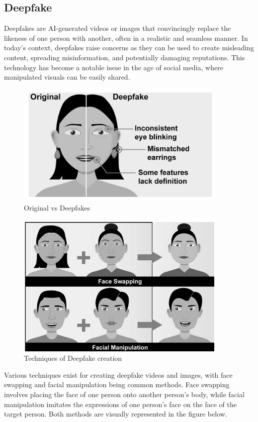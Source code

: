
\subsection{Deepfake}
Deepfakes are AI-generated videos or images that convincingly replace the likeness of one person with another, often in a realistic and seamless manner. In today's context, deepfakes raise concerns as they can be used to create misleading content, spreading misinformation, and potentially damaging reputations. This technology has become a notable issue in the age of social media, where manipulated visuals can be easily shared.\\
\begin{figure}[htbp]
    \centering
    \includegraphics[width=4in]{img/deefakeface.png}
    \caption{{Original vs Deepfakes }}
\end{figure}


\begin{figure}[htbp]
    \centering
    \includegraphics[width=4in]{img/face manipulation.png}
    \caption{{Techniques of Deepfake creation}}
\end{figure}
Various techniques exist for creating deepfake videos and images, with face swapping and facial manipulation being common methods. Face swapping involves placing the face of one person onto another person's body, while facial manipulation imitates the expressions of one person's face on the face of the target person. Both methods are visually represented in the figure below.\\



